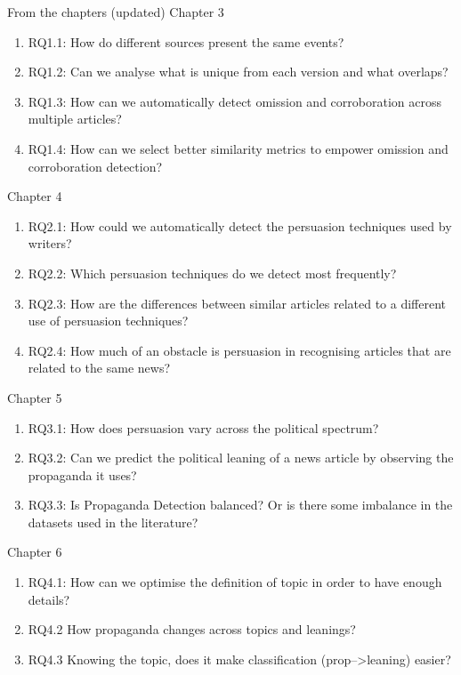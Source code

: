 From the chapters (updated)
Chapter 3
\begin{enumerate}
    \item RQ1.1: How do different sources present the same events?
    \item RQ1.2: Can we analyse what is unique from each version and what overlaps? 
    \item RQ1.3: How can we automatically detect omission and corroboration across multiple articles?
    \item RQ1.4: How can we select better similarity metrics to empower omission and corroboration detection?
\end{enumerate}


Chapter 4
\begin{enumerate}
    \item RQ2.1: How could we automatically detect the persuasion techniques used by writers?
    \item RQ2.2: Which persuasion techniques do we detect most frequently? 
    \item RQ2.3: How are the differences between similar articles related to a different use of persuasion techniques?
    \item RQ2.4: How much of an obstacle is persuasion in recognising articles that are related to the same news?
\end{enumerate}


Chapter 5
\begin{enumerate}
    \item RQ3.1: How does persuasion vary across the political spectrum?
    \item RQ3.2: Can we predict the political leaning of a news article by observing the propaganda it uses? 
    \item RQ3.3: Is Propaganda Detection balanced? Or is there some imbalance in the datasets used in the literature?
\end{enumerate}



Chapter 6
\begin{enumerate}
    \item RQ4.1: How can we optimise the definition of topic in order to have enough details?
    \item RQ4.2 How propaganda changes across topics and leanings?
    \item RQ4.3 Knowing the topic, does it make classification (prop-->leaning) easier?
\end{enumerate}


